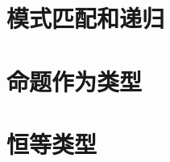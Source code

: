 \section{模式匹配和递归}
\label{sec:pattern-matching}


\section{命题作为类型}
\label{sec:pat}


\section{恒等类型}
\label{sec:identity-types}




